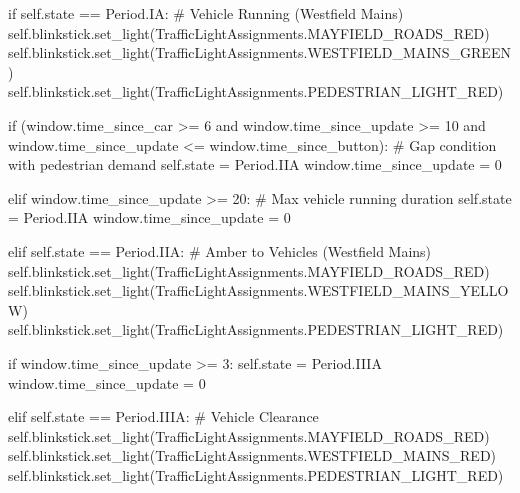 \documentclass[
  letterpaper,
  DIV=11,
  numbers=noendperiod]{scrartcl}
\newenvironment{Shaded}{\begin{snugshade}}{\end{snugshade}}
\newcommand{\CommentTok}[1]{\textcolor[rgb]{0.37,0.37,0.37}{#1}}
\newcommand{\ControlFlowTok}[1]{\textcolor[rgb]{0.00,0.23,0.31}{#1}}
\newcommand{\DecValTok}[1]{\textcolor[rgb]{0.68,0.00,0.00}{#1}}
\newcommand{\KeywordTok}[1]{\textcolor[rgb]{0.00,0.23,0.31}{#1}}
\newcommand{\NormalTok}[1]{\textcolor[rgb]{0.00,0.23,0.31}{#1}}
\newcommand{\OperatorTok}[1]{\textcolor[rgb]{0.37,0.37,0.37}{#1}}
\newcommand{\VariableTok}[1]{\textcolor[rgb]{0.07,0.07,0.07}{#1}}
\begin{document}
\begin{Shaded}
\begin{Highlighting}[]
        \ControlFlowTok{if} \VariableTok{self}\NormalTok{.state }\OperatorTok{==}\NormalTok{ Period.IA:}
            \CommentTok{\# Vehicle Running (Westfield Mains)}
            \VariableTok{self}\NormalTok{.blinkstick.set\_light(TrafficLightAssignments.MAYFIELD\_ROADS\_RED)}
            \VariableTok{self}\NormalTok{.blinkstick.set\_light(TrafficLightAssignments.WESTFIELD\_MAINS\_GREEN)}
            \VariableTok{self}\NormalTok{.blinkstick.set\_light(TrafficLightAssignments.PEDESTRIAN\_LIGHT\_RED)}
            
            \ControlFlowTok{if}\NormalTok{ (window.time\_since\_car }\OperatorTok{\textgreater{}=} \DecValTok{6} \KeywordTok{and} 
\NormalTok{                window.time\_since\_update }\OperatorTok{\textgreater{}=} \DecValTok{10} \KeywordTok{and} 
\NormalTok{                window.time\_since\_update }\OperatorTok{\textless{}=}\NormalTok{ window.time\_since\_button):}
                \CommentTok{\# Gap condition with pedestrian demand}
                \VariableTok{self}\NormalTok{.state }\OperatorTok{=}\NormalTok{ Period.IIA}
\NormalTok{                window.time\_since\_update }\OperatorTok{=} \DecValTok{0}

            \ControlFlowTok{elif}\NormalTok{ window.time\_since\_update }\OperatorTok{\textgreater{}=} \DecValTok{20}\NormalTok{:}
                \CommentTok{\# Max vehicle running duration}
                \VariableTok{self}\NormalTok{.state }\OperatorTok{=}\NormalTok{ Period.IIA}
\NormalTok{                window.time\_since\_update }\OperatorTok{=} \DecValTok{0}
        
        \ControlFlowTok{elif} \VariableTok{self}\NormalTok{.state }\OperatorTok{==}\NormalTok{ Period.IIA:}
            \CommentTok{\# Amber to Vehicles (Westfield Mains)}
            \VariableTok{self}\NormalTok{.blinkstick.set\_light(TrafficLightAssignments.MAYFIELD\_ROADS\_RED)}
            \VariableTok{self}\NormalTok{.blinkstick.set\_light(TrafficLightAssignments.WESTFIELD\_MAINS\_YELLOW)}
            \VariableTok{self}\NormalTok{.blinkstick.set\_light(TrafficLightAssignments.PEDESTRIAN\_LIGHT\_RED)}
            
            \ControlFlowTok{if}\NormalTok{ window.time\_since\_update }\OperatorTok{\textgreater{}=} \DecValTok{3}\NormalTok{:}
                \VariableTok{self}\NormalTok{.state }\OperatorTok{=}\NormalTok{ Period.IIIA}
\NormalTok{                window.time\_since\_update }\OperatorTok{=} \DecValTok{0}

        \ControlFlowTok{elif} \VariableTok{self}\NormalTok{.state }\OperatorTok{==}\NormalTok{ Period.IIIA:}
            \CommentTok{\# Vehicle Clearance}
            \VariableTok{self}\NormalTok{.blinkstick.set\_light(TrafficLightAssignments.MAYFIELD\_ROADS\_RED)}
            \VariableTok{self}\NormalTok{.blinkstick.set\_light(TrafficLightAssignments.WESTFIELD\_MAINS\_RED)}
            \VariableTok{self}\NormalTok{.blinkstick.set\_light(TrafficLightAssignments.PEDESTRIAN\_LIGHT\_RED)}
            

\end{Highlighting}
\end{Shaded}
\end{document}
